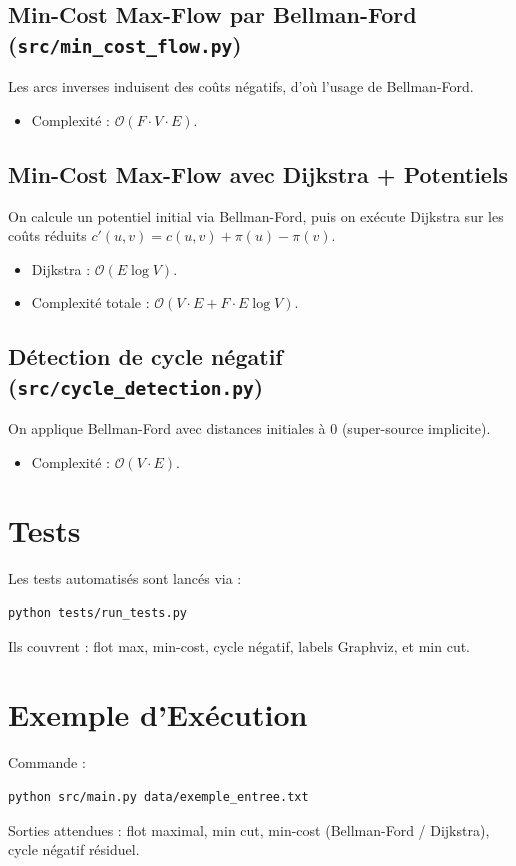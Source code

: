 \documentclass[11pt,a4paper]{article}
\begin{document}
\subsection{Min-Cost Max-Flow par Bellman-Ford (\texttt{src/min\_cost\_flow.py})}
Les arcs inverses induisent des co\^uts n\'egatifs, d'o\`u l'usage de Bellman-Ford.
\begin{itemize}
    \item Complexit\'e : $\mathcal{O}(F \cdot V \cdot E)$.
\end{itemize}

\subsection{Min-Cost Max-Flow avec Dijkstra + Potentiels}
On calcule un potentiel initial via Bellman-Ford, puis on ex\'ecute Dijkstra sur les co\^uts r\'eduits $c'(u,v) = c(u,v) + \pi(u) - \pi(v)$.
\begin{itemize}
    \item Dijkstra : $\mathcal{O}(E \log V)$.
    \item Complexit\'e totale : $\mathcal{O}(V \cdot E + F \cdot E \log V)$.
\end{itemize}

\subsection{D\'etection de cycle n\'egatif (\texttt{src/cycle\_detection.py})}
On applique Bellman-Ford avec distances initiales \`a 0 (super-source implicite).
\begin{itemize}
    \item Complexit\'e : $\mathcal{O}(V \cdot E)$.
\end{itemize}

\section{Tests}
Les tests automatis\'es sont lanc\'es via :
\begin{verbatim}
python tests/run_tests.py
\end{verbatim}
Ils couvrent : flot max, min-cost, cycle n\'egatif, labels Graphviz, et min cut.

\section{Exemple d'Ex\'ecution}
Commande :
\begin{verbatim}
python src/main.py data/exemple_entree.txt
\end{verbatim}
Sorties attendues : flot maximal, min cut, min-cost (Bellman-Ford / Dijkstra), cycle n\'egatif r\'esiduel.
\end{document}
